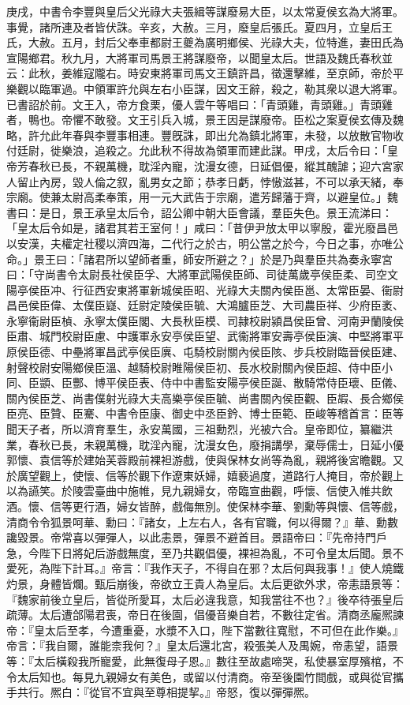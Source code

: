 \begin{pinyinscope}
庚戌，中書令李豐與皇后父光祿大夫張緝等謀廢易大臣，以太常夏侯玄為大將軍。事覺，諸所連及者皆伏誅。辛亥，大赦。三月，廢皇后張氏。夏四月，立皇后王氏，大赦。五月，封后父奉車都尉王夔為廣明鄉侯、光祿大夫，位特進，妻田氏為宣陽鄉君。秋九月，大將軍司馬景王將謀廢帝，以聞皇太后。世語及魏氏春秋並云：此秋，姜維寇隴右。時安東將軍司馬文王鎮許昌，徵還擊維，至京師，帝於平樂觀以臨軍過。中領軍許允與左右小臣謀，因文王辭，殺之，勒其衆以退大將軍。已書詔於前。文王入，帝方食栗，優人雲午等唱曰：「青頭雞，青頭雞。」青頭雞者，鴨也。帝懼不敢發。文王引兵入城，景王因是謀廢帝。臣松之案夏侯玄傳及魏略，許允此年春與李豐事相連。豐旣誅，即出允為鎮北將軍，未發，以放散官物收付廷尉，徙樂浪，追殺之。允此秋不得故為領軍而建此謀。甲戌，太后令曰：「皇帝芳春秋已長，不親萬機，耽淫內寵，沈漫女德，日延倡優，縱其醜謔；迎六宮家人留止內房，毀人倫之叙，亂男女之節；恭孝日虧，悖慠滋甚，不可以承天緒，奉宗廟。使兼太尉高柔奉策，用一元大武告于宗廟，遣芳歸藩于齊，以避皇位。」魏書曰：是日，景王承皇太后令，詔公卿中朝大臣會議，羣臣失色。景王流涕曰：「皇太后令如是，諸君其若王室何！」咸曰：「昔伊尹放太甲以寧殷，霍光廢昌邑以安漢，夫權定社稷以濟四海，二代行之於古，明公當之於今，今日之事，亦唯公命。」景王曰：「諸君所以望師者重，師安所避之？」於是乃與羣臣共為奏永寧宮曰：「守尚書令太尉長社侯臣孚、大將軍武陽侯臣師、司徒萬歲亭侯臣柔、司空文陽亭侯臣冲、行征西安東將軍新城侯臣昭、光祿大夫關內侯臣邕、太常臣晏、衞尉昌邑侯臣偉、太僕臣嶷、廷尉定陵侯臣毓、大鴻臚臣芝、大司農臣祥、少府臣袤、永寧衞尉臣楨、永寧太僕臣閣、大長秋臣模、司隷校尉潁昌侯臣曾、河南尹蘭陵侯臣肅、城門校尉臣慮、中護軍永安亭侯臣望、武衞將軍安壽亭侯臣演、中堅將軍平原侯臣德、中壘將軍昌武亭侯臣廙、屯騎校尉關內侯臣陔、步兵校尉臨晉侯臣建、射聲校尉安陽鄉侯臣溫、越騎校尉睢陽侯臣初、長水校尉關內侯臣超、侍中臣小同、臣顗、臣酆、博平侯臣表、侍中中書監安陽亭侯臣誕、散騎常侍臣瓌、臣儀、關內侯臣芝、尚書僕射光祿大夫高樂亭侯臣毓、尚書關內侯臣觀、臣嘏、長合鄉侯臣亮、臣贊、臣騫、中書令臣康、御史中丞臣鈐、博士臣範、臣峻等稽首言：臣等聞天子者，所以濟育羣生，永安萬國，三祖勳烈，光被六合。皇帝即位，纂繼洪業，春秋已長，未親萬機，耽淫內寵，沈漫女色，廢捐講學，棄辱儒士，日延小優郭懷、袁信等於建始芙蓉殿前裸袒游戲，使與保林女尚等為亂，親將後宮瞻觀。又於廣望觀上，使懷、信等於觀下作遼東妖婦，嬉褻過度，道路行人掩目，帝於觀上以為讌笑。於陵雲臺曲中施帷，見九親婦女，帝臨宣曲觀，呼懷、信使入帷共飲酒。懷、信等更行酒，婦女皆醉，戲侮無別。使保林李華、劉勳等與懷、信等戲，清商令令狐景呵華、勳曰：『諸女，上左右人，各有官職，何以得爾？』華、勳數讒毀景。帝常喜以彈彈人，以此恚景，彈景不避首目。景語帝曰：『先帝持門戶急，今陛下日將妃后游戲無度，至乃共觀倡優，裸袒為亂，不可令皇太后聞。景不愛死，為陛下計耳。』帝言：『我作天子，不得自在邪？太后何與我事！』使人燒鐵灼景，身體皆爛。甄后崩後，帝欲立王貴人為皇后。太后更欲外求，帝恚語景等：『魏家前後立皇后，皆從所愛耳，太后必違我意，知我當往不也？』後卒待張皇后疏薄。太后遭郃陽君喪，帝日在後園，倡優音樂自若，不數往定省。清商丞龐熈諫帝：『皇太后至孝，今遭重憂，水漿不入口，陛下當數往寬慰，不可但在此作樂。』帝言：『我自爾，誰能柰我何？』皇太后還北宮，殺張美人及禺婉，帝恚望，語景等：『太后橫殺我所寵愛，此無復母子恩。』數往至故處啼哭，私使暴室厚殯棺，不令太后知也。每見九親婦女有美色，或留以付清商。帝至後園竹間戲，或與從官攜手共行。熈白：『從官不宜與至尊相提挈。』帝怒，復以彈彈熈。
\end{pinyinscope}

